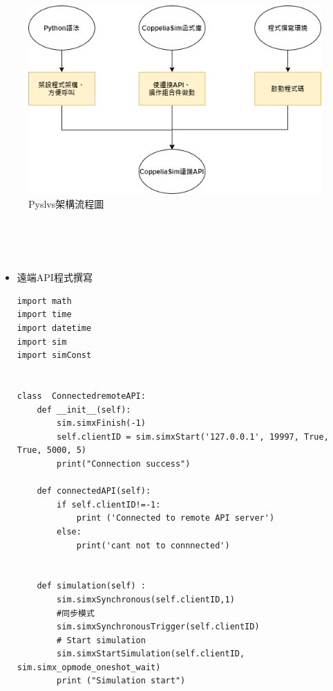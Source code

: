 \documentclass[14pt,a4paper]{report}  %
\begin{document}
{{{{     \begin{figure}[hbt!]
        \centering
        \includegraphics[scale=0.6]{CoppeliaSim API.png} 
        \caption{Pyslvs架構流程圖}
        \label{fig_coppeliasim API:scale}
        \end{figure}
        
     
     \hspace*{\fill} \\
     \hspace*{\fill} \\
     \hspace*{\fill} \\
     \begin{itemize}
     \item 遠端API程式撰寫
     \hspace*{\fill} \\
		\begin{lstlisting}[caption=遠端API程式架構]
import math 
import time
import datetime
import sim 
import simConst


class  ConnectedremoteAPI:
    def __init__(self):
        sim.simxFinish(-1)
        self.clientID = sim.simxStart('127.0.0.1', 19997, True, True, 5000, 5)
        print("Connection success")
          
    def connectedAPI(self):
        if self.clientID!=-1:
            print ('Connected to remote API server')
        else:
            print('cant not to connnected')
            
        
    def simulation(self) :
        sim.simxSynchronous(self.clientID,1)
        #同步模式
        sim.simxSynchronousTrigger(self.clientID)
        # Start simulation
        sim.simxStartSimulation(self.clientID, sim.simx_opmode_oneshot_wait)
        print ("Simulation start")


\end{lstlisting}
\end{itemize}}}}}
\end{document}
